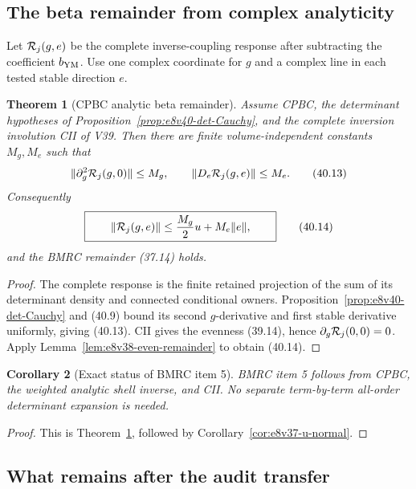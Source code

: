\documentclass[11pt,oneside]{book}
\newtheorem{theorem}{Theorem}[chapter]
\newtheorem{corollary}[theorem]{Corollary}
\theoremstyle{definition}
\theoremstyle{remark}
\begin{document}
\subsection{The beta remainder from complex analyticity}

Let \({\cal R}_j(g,e)\) be the complete inverse-coupling response
after subtracting the coefficient \(b_{\rm YM}\).  Use one complex
coordinate for \(g\) and a complex line in each tested stable
direction \(e\).

\begin{theorem}[CPBC analytic beta remainder]
\label{thm:e8v40-beta-remainder}
Assume CPBC, the determinant hypotheses of
Proposition~\ref{prop:e8v40-det-Cauchy}, and the complete inversion
involution CII of V39.  Then there are finite volume-independent
constants \(M_g,M_e\) such that
\[
 \|\partial_g^2{\cal R}_j(g,0)\|\leq M_g,\qquad
 \|D_e{\cal R}_j(g,e)\|\leq M_e.                                \tag{40.13}
\]
Consequently
\[
 \boxed{\qquad
 \|{\cal R}_j(g,e)\|
 \leq\frac{M_g}{2}u+M_e\|e\|,
\qquad}                                                         \tag{40.14}
\]
and the BMRC remainder (37.14) holds.
\end{theorem}

\begin{proof}
The complete response is the finite retained projection of the sum
of its determinant density and connected conditional owners.
Proposition~\ref{prop:e8v40-det-Cauchy} and (40.9) bound its second
\(g\)-derivative and first stable derivative uniformly, giving
(40.13).  CII gives the evenness (39.14), hence
\(\partial_g{\cal R}_j(0,0)=0\).  Apply
Lemma~\ref{lem:e8v38-even-remainder} to obtain (40.14).
\end{proof}

\begin{corollary}[Exact status of BMRC item 5]
\label{cor:e8v40-BMRC5}
BMRC item 5 follows from CPBC, the weighted analytic shell inverse,
and CII.  No separate term-by-term all-order determinant expansion is
needed.
\end{corollary}

\begin{proof}
This is Theorem~\ref{thm:e8v40-beta-remainder}, followed by
Corollary~\ref{cor:e8v37-u-normal}.
\end{proof}

\subsection{What remains after the audit transfer}
\end{document}
